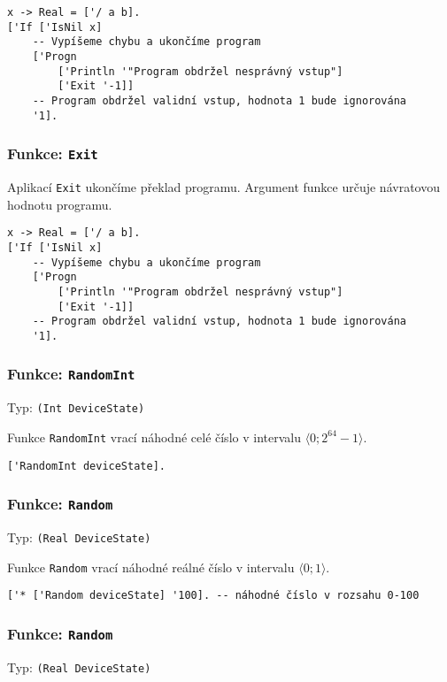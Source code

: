 \begin{lstlisting}[caption={Ukázka využití IsNil}]
x -> Real = ['/ a b].
['If ['IsNil x]
    -- Vypíšeme chybu a ukončíme program
    ['Progn
        ['Println '"Program obdržel nesprávný vstup"]
        ['Exit '-1]]
    -- Program obdržel validní vstup, hodnota 1 bude ignorována
    '1].
\end{lstlisting}

\subsubsection*{Funkce: \lstinline{Exit}}

Aplikací \lstinline{Exit} ukončíme překlad programu. Argument funkce určuje návratovou hodnotu
programu.

\begin{lstlisting}[caption={Ukázka využití Exit}]
x -> Real = ['/ a b].
['If ['IsNil x]
    -- Vypíšeme chybu a ukončíme program
    ['Progn
        ['Println '"Program obdržel nesprávný vstup"]
        ['Exit '-1]]
    -- Program obdržel validní vstup, hodnota 1 bude ignorována
    '1].
\end{lstlisting}

\subsubsection*{Funkce: \lstinline{RandomInt}}
Typ: \lstinline{(Int DeviceState)}

Funkce \lstinline{RandomInt} vrací náhodné celé číslo v intervalu $\bigl \langle 0; 2^{64}-1 \bigr \rangle$.

\begin{lstlisting}[caption={Ukázka využití RandomInt}]
['RandomInt deviceState].
\end{lstlisting}

\subsubsection*{Funkce: \lstinline{Random}}
Typ: \lstinline{(Real DeviceState)}

Funkce \lstinline{Random} vrací náhodné reálné číslo v intervalu $\bigl \langle 0; 1 \bigr \rangle$.

\begin{lstlisting}[caption={Ukázka využití Random}]
['* ['Random deviceState] '100]. -- náhodné číslo v rozsahu 0-100
\end{lstlisting}

\subsubsection*{Funkce: \lstinline{Random}}
Typ: \lstinline{(Real DeviceState)}


